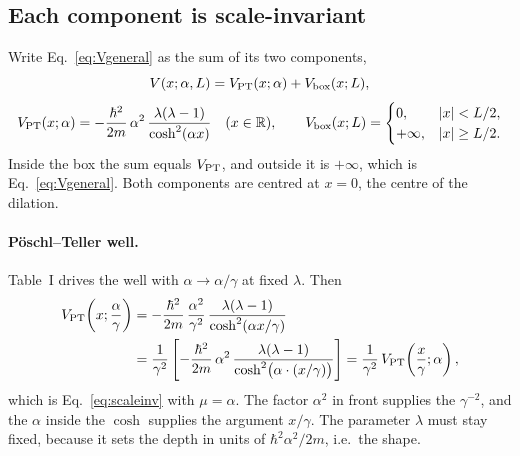 \documentclass[11pt]{article}
\numberwithin{equation}{section}
\begin{document}
\subsection{Each component is scale-invariant}
Write Eq.~\eqref{eq:Vgeneral} as the sum of its two components,
\begin{equation}
V(x;\alpha,L)=V_{\rm PT}(x;\alpha)+V_{\rm box}(x;L),
\label{eq:Vsplit}
\end{equation}
\[
V_{\rm PT}(x;\alpha)=-\frac{\hbar^2}{2m}\,\alpha^2\,\frac{\lambda(\lambda-1)}{\cosh^2(\alpha x)}\quad(x\in\mathbb R),\qquad
V_{\rm box}(x;L)=\begin{cases}0,&|x|<L/2,\\+\infty,&|x|\ge L/2.\end{cases}
\]
Inside the box the sum equals $V_{\rm PT}$, and outside it is $+\infty$, which is Eq.~\eqref{eq:Vgeneral}. Both components are centred at $x=0$, the centre of the dilation.

\paragraph{P\"oschl--Teller well.} Table~I drives the well with $\alpha\to\alpha/\gamma$ at fixed $\lambda$. Then
\begin{align}
V_{\rm PT}\!\left(x;\frac{\alpha}{\gamma}\right)&=-\frac{\hbar^2}{2m}\,\frac{\alpha^2}{\gamma^2}\,\frac{\lambda(\lambda-1)}{\cosh^2(\alpha x/\gamma)}\nonumber\\
&=\frac{1}{\gamma^2}\left[-\frac{\hbar^2}{2m}\,\alpha^2\,\frac{\lambda(\lambda-1)}{\cosh^2\!\big(\alpha\cdot(x/\gamma)\big)}\right]=\frac{1}{\gamma^2}\,V_{\rm PT}\!\left(\frac{x}{\gamma};\alpha\right),
\label{eq:PTscale}
\end{align}
which is Eq.~\eqref{eq:scaleinv} with $\mu=\alpha$. The factor $\alpha^2$ in front supplies the $\gamma^{-2}$, and the $\alpha$ inside the $\cosh$ supplies the argument $x/\gamma$. The parameter $\lambda$ must stay fixed, because it sets the depth in units of $\hbar^2\alpha^2/2m$, i.e.\ the shape.
\end{document}

